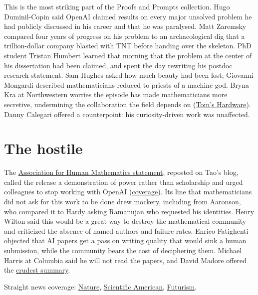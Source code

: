 \documentclass[11pt]{article}
\begin{document}
This is the most striking part of the Proofs and Prompts collection. Hugo
Duminil-Copin said OpenAI claimed results on every major unsolved problem he
had publicly discussed in his career and that he was paralysed. Matt Zaremsky
compared four years of progress on his problem to an archaeological dig that a
trillion-dollar company blasted with TNT before handing over the skeleton. PhD
student Tristan Humbert learned that morning that the problem at the center of
his dissertation had been claimed, and spent the day rewriting his postdoc
research statement. Sam Hughes asked how much beauty had been lost; Giovanni
Mongardi described mathematicians reduced to priests of a machine god. Bryna
Kra at Northwestern worries the episode has made mathematicians more
secretive, undermining the collaboration the field depends on
(\href{https://www.tomshardware.com/tech-industry/artificial-intelligence/ai-causes-uproar-in-mathematics-as-experts-warn-against-sharing-research-with-llms-after-openai-shares-722-manuscripts-and-proofs-professor-argues-that-the-field-must-focus-on-building-community-over-raw-solutions}{Tom's Hardware}).
Danny Calegari offered a counterpoint: his curiosity-driven work was
unaffected.

\section*{The hostile}

The \href{https://www.ahmath.org/statements}{Association for Human Mathematics statement},
reposted on Tao's blog, called the release a demonstration of power rather
than scholarship and urged colleagues to stop working with OpenAI
(\href{https://mezha.ua/en/news/mathematicians-urge-end-to-openai-collaboration-315962/}{coverage}).
Its line that mathematicians did not ask for this work to be done drew
mockery, including from Aaronson, who compared it to Hardy asking Ramanujan
who requested his identities. Henry Wilton said this would be a great way to
destroy the mathematical community and criticized the absence of named authors
and failure rates. Enrico Fatighenti objected that AI papers get a pass on
writing quality that would sink a human submission, while the community bears
the cost of deciphering them. Michael Harris at Columbia said he will not read
the papers, and David Madore offered the
\href{https://x.com/gro_tsen/status/2108217461577294035}{crudest summary}.

Straight news coverage:
\href{https://www.nature.com/articles/d41586-026-03196-8}{Nature},
\href{https://www.scientificamerican.com/article/openai-unleashes-hundreds-more-math-results-upon-a-field-already-in-shock/}{Scientific American},
\href{https://futurism.com/artificial-intelligence/mathematicians-openai-furious}{Futurism}.
\end{document}
